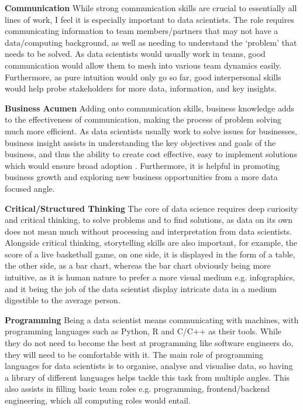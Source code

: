 \documentclass[a4paper, 11pt]{report}
\begin{document}
\textbf{Communication}
While strong communication skills are crucial to essentially all lines of work, I feel it is especially important to data scientists. The role requires communicating information to team members/partners that may not have a data/computing background, as well as needing to understand the ‘problem’ that needs to be solved. As data scientists would usually work in teams, good communication would allow them to mesh into various team dynamics easily. Furthermore, as pure intuition would only go so far, good interpersonal skills would help probe stakeholders for more data, information, and key insights.

\textbf{Business Acumen}
Adding onto communication skills, business knowledge adds to the effectiveness of communication, making the process of problem solving much more efficient. As data scientists usually work to solve issues for businesses, business insight assists in understanding the key objectives and goals of the business, and thus the ability to create cost effective, easy to implement solutions which would ensure broad adoption \cite{ali2}. Furthermore, it is helpful in promoting business growth and exploring new business opportunities from a more data focused angle.

\textbf{Critical/Structured Thinking}
The core of data science requires deep curiosity and critical thinking, to solve problems and to find solutions, as data on its own does not mean much without processing and interpretation from data scientists. Alongside critical thinking, storytelling skills are also important, for example, the score of a live basketball game, on one side, it is displayed in the form of a table, the other side, as a bar chart, whereas the bar chart obviously being more intuitive, as it is human nature to prefer a more visual medium e.g. infographics, and it being the job of the data scientist display intricate data in a medium digestible to the average person.

\textbf{Programming}
Being a data scientist means communicating with machines, with programming languages such as Python, R and C/C++ as their tools. While they do not need to become the best at programming like software engineers do, they will need to be comfortable with it. The main role of programming languages for data scientists is to organise, analyse and visualise data, so having a library of different languages helps tackle this task from multiple angles. This also assists in filling basic team roles e.g. programming, frontend/backend engineering, which all computing roles would entail.
\end{document}
